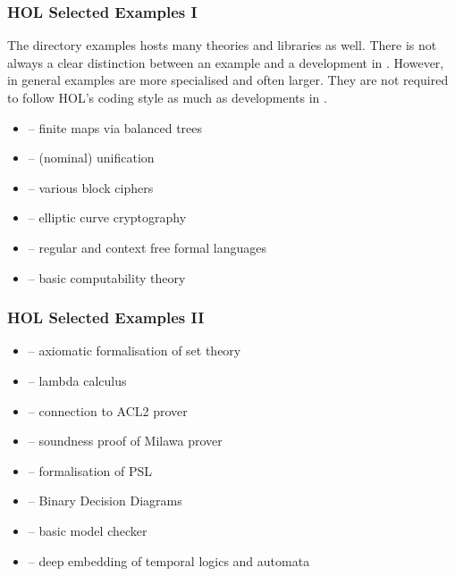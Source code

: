 \begin{frame}
\frametitle{HOL Selected Examples I}

The directory examples hosts many theories and libraries as well. There is not
always a clear distinction between an example and a development in . However, 
in general examples are more specialised and often larger. They are not required to
follow HOL's coding style as much as developments in .
\bigskip

\begin{itemize}
\item {} -- finite maps via balanced trees
\item {} -- (nominal) unification
\item {} -- various block ciphers
\item {} -- elliptic curve cryptography
\item {} -- regular and context free formal languages
\item {} -- basic computability theory
\end{itemize}
\end{frame}



\begin{frame}
\frametitle{HOL Selected Examples II}
\begin{itemize}
\item {} -- axiomatic formalisation of set theory
\item {} -- lambda calculus
\item {} -- connection to ACL2 prover
\item {} -- soundness proof of Milawa prover
\item {} -- formalisation of PSL
\item {} -- Binary Decision Diagrams
\item {} -- basic model checker
\item {} -- deep embedding of temporal logics and automata
\end{itemize}
\end{frame}

